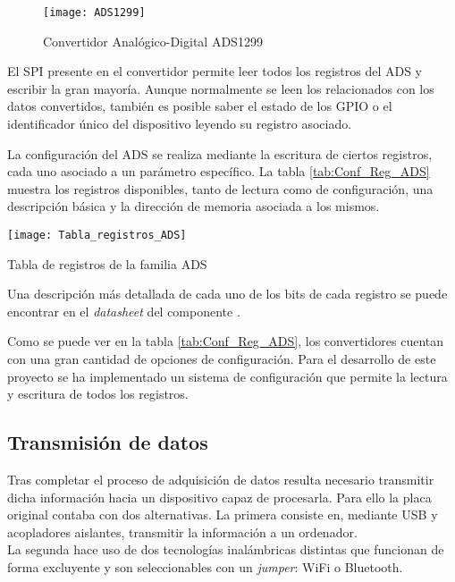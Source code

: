 \begin{figure} [h]
    \centering
    \texttt{[image: ADS1299]}
    \caption{Convertidor Analógico-Digital ADS1299}
    \label{fig:ADS1299}
\end{figure}

El \acrshort{SPI} presente en el convertidor permite leer todos los registros del ADS y escribir la gran mayoría. Aunque normalmente se leen los relacionados con los datos convertidos, también es posible saber el estado de los \acrshort{GPIO} o el identificador único del dispositivo leyendo su registro asociado.

La configuración del ADS se realiza mediante la escritura de ciertos registros, cada uno asociado a un parámetro específico. La tabla \ref{tab:Conf_Reg_ADS} muestra los registros disponibles, tanto de lectura como de configuración, una descripción básica y la dirección de memoria asociada a los mismos.

\begin{table} [h]
    \centering
    \texttt{[image: Tabla\_registros\_ADS]}
    \caption{Tabla de registros de la familia ADS \cite{Datasheet_ADS}}
    \label{tab:Conf_Reg_ADS}
\end{table}

Una descripción más detallada de cada uno de los bits de cada registro se puede encontrar en el \textit{datasheet} del componente \cite{Datasheet_ADS}.

Como se puede ver en la tabla \ref{tab:Conf_Reg_ADS}, los convertidores cuentan con una gran cantidad de opciones de configuración. Para el desarrollo de este proyecto se ha implementado un sistema de configuración que permite la lectura y escritura de todos los registros.

\subsection{Transmisión de datos\label{sec:Transmisión_N}}

Tras completar el proceso de adquisición de datos resulta necesario transmitir dicha información hacia un dispositivo capaz de procesarla. Para ello la placa original contaba con dos alternativas. La primera consiste en, mediante \acrshort{USB} y acopladores aislantes, transmitir la información a un ordenador. 
\\La segunda hace uso de dos tecnologías inalámbricas distintas que funcionan de forma excluyente y son seleccionables con un \textit{jumper}: WiFi o Bluetooth.

